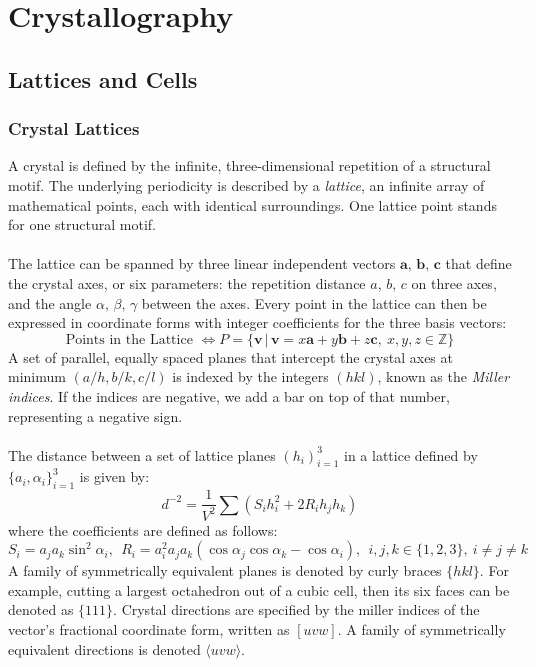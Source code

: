 \chapter{Crystallography}

\section{Lattices and Cells}

\subsection{Crystal Lattices}

A crystal is defined by the infinite, three-dimensional repetition of a structural motif. 
The underlying periodicity is described by a \emph{lattice}, an infinite array of mathematical points, each with identical surroundings. 
One lattice point stands for one structural motif.\\ \\
%
The lattice can be spanned by three linear independent vectors $\mathbf{a},\, \mathbf{b},\, \mathbf{c}$ that define the crystal axes, 
or six parameters: the repetition distance $a,\, b,\, c$ on three axes, and the angle $\alpha,\, \beta,\, \gamma$ between the axes. 
Every point in the lattice can then be expressed in coordinate forms with integer coefficients for the three basis vectors:
%
\[
	\text{Points in the Lattice } 
	\Leftrightarrow 
	P=\{\mathbf{v}\,|\,\mathbf{v}=x\mathbf{a}+y\mathbf{b}+z\mathbf{c},\ x,y,z\in\mathbb{Z}\}
\]
%
A set of parallel, equally spaced planes that intercept the crystal axes at minimum $(a/h, b/k, c/l)$ 
is indexed by the integers $(hkl)$, known as the \emph{Miller indices}. 
If the indices are negative, we add a bar on top of that number, representing a negative sign.\\ \\
%
The distance between a set of lattice planes $(h_i)_{i=1}^{3}$ in a lattice defined by $\{a_i,\alpha_i\}_{i=1}^{3}$ is given by:
%
\[
	d^{-2} = \frac{1}{V^2} \sum( S_i h_i ^ 2 + 2 R_i h_j h_k )
\]
%
where the coefficients are defined as follows:
%
\[
	S_i=a_ja_k\sin^2\alpha_i,\ \ 
	R_i=a_i^2a_ja_k(\cos\alpha_j\cos\alpha_k-\cos\alpha_i),\ \ 
	i,j,k\in\{1,2,3\},\ i\neq j\neq k
\]
%
A family of symmetrically equivalent planes is denoted by curly braces $\{hkl\}$. 
For example, cutting a largest octahedron out of a cubic cell, then its six faces can be denoted as $\{111\}$.
Crystal directions are specified by the miller indices of the vector's fractional coordinate form, written as $[uvw]$. 
A family of symmetrically equivalent directions is denoted $\langle uvw\rangle$.
%
